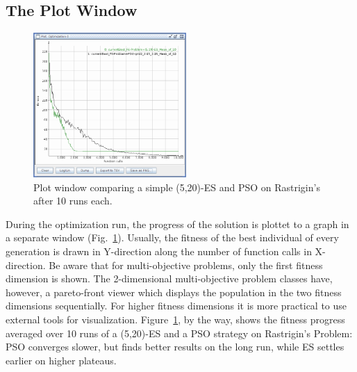 \subsection{The Plot Window}

\begin{figure}
\noindent \begin{centering}
\includegraphics[width=0.52\textwidth]{pics/screenshot-plot-window}
\par\end{centering}

\caption{Plot window comparing a simple (5,20)-ES and PSO on Rastrigin's after
10 runs each.\label{fig:The-plot-window}}
\end{figure}


During the optimization run, the progress of the solution is plottet
to a graph in a separate window (Fig.~\ref{fig:The-plot-window}).
Usually, the fitness of the best individual of every generation is
drawn in Y-direction along the number of function calls in X-direction.
Be aware that for multi-objective problems, only the first fitness
dimension is shown. The 2-dimensional multi-objective problem classes
have, however, a pareto-front viewer which displays the population
in the two fitness dimensions sequentially. For higher fitness dimensions
it is more practical to use external tools for visualization. Figure~\ref{fig:The-plot-window},
by the way, shows the fitness progress averaged over 10 runs of a
(5,20)-ES and a PSO strategy on Rastrigin's Problem: PSO converges
slower, but finds better results on the long run, while ES settles
earlier on higher plateaus. 

